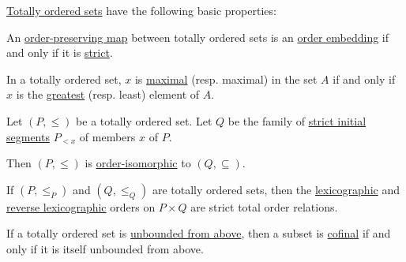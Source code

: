 \begin{proposition}\label{thm:def:totally_ordered_set}
  \hyperref[def:totally_ordered_set]{Totally ordered sets} have the following basic properties:
  \begin{thmenum}
     An \hyperref[def:order_function/preserving]{order-preserving map} between totally ordered sets is an \hyperref[def:preordered_set/homomorphism]{order embedding} if and only if it is \hyperref[def:order_function/preserving]{strict}.

     In a totally ordered set, \( x \) is \hyperref[def:extremal_points/maximal_and_minimal_element]{maximal} (resp. maximal) in the set \( A \) if and only if \( x \) is the \hyperref[def:extremal_points/greatest_and_least]{greatest} (resp. least) element of \( A \).

     Let \( (P, \leq) \) be a totally ordered set. Let \( Q \) be the family of \hyperref[def:order_interval/unbounded]{strict initial segments} \( P_{<x} \) of members \( x \) of \( P \).

    Then \( (P, \leq) \) is \hyperref[def:preordered_set/homomorphism]{order-isomorphic} to \( (Q, \subseteq) \).

     If \( (P, \leq_P) \) and \( (Q, \leq_Q) \) are totally ordered sets, then the \hyperref[eq:def:lexicographic_order]{lexicographic} and \hyperref[eq:def:lexicographic_order/reverse]{reverse lexicographic} orders on \( P \times Q \) are strict total order relations.

     If a totally ordered set is \hyperref[def:extremal_points/bounds]{unbounded from above}, then a subset is \hyperref[def:cofinal_set]{cofinal} if and only if it is itself unbounded from above.
  \end{thmenum}
\end{proposition}
